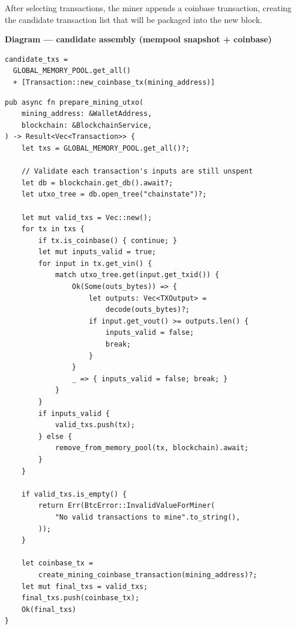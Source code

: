 After selecting transactions, the miner appends a coinbase transaction, creating the candidate transaction list that will be packaged into the new block.

\textbf{Diagram --- candidate assembly (mempool snapshot + coinbase)}

\begin{verbatim}
candidate_txs =
  GLOBAL_MEMORY_POOL.get_all()
  + [Transaction::new_coinbase_tx(mining_address)]
\end{verbatim}

\begin{listing}[htbp]
\caption{Candidate assembly ()}
\label{lst:9-6-2}
\begin{verbatim}
pub async fn prepare_mining_utxo(
    mining_address: &WalletAddress,
    blockchain: &BlockchainService,
) -> Result<Vec<Transaction>> {
    let txs = GLOBAL_MEMORY_POOL.get_all()?;

    // Validate each transaction's inputs are still unspent
    let db = blockchain.get_db().await?;
    let utxo_tree = db.open_tree("chainstate")?;

    let mut valid_txs = Vec::new();
    for tx in txs {
        if tx.is_coinbase() { continue; }
        let mut inputs_valid = true;
        for input in tx.get_vin() {
            match utxo_tree.get(input.get_txid()) {
                Ok(Some(outs_bytes)) => {
                    let outputs: Vec<TXOutput> =
                        decode(outs_bytes)?;
                    if input.get_vout() >= outputs.len() {
                        inputs_valid = false;
                        break;
                    }
                }
                _ => { inputs_valid = false; break; }
            }
        }
        if inputs_valid {
            valid_txs.push(tx);
        } else {
            remove_from_memory_pool(tx, blockchain).await;
        }
    }

    if valid_txs.is_empty() {
        return Err(BtcError::InvalidValueForMiner(
            "No valid transactions to mine".to_string(),
        ));
    }

    let coinbase_tx =
        create_mining_coinbase_transaction(mining_address)?;
    let mut final_txs = valid_txs;
    final_txs.push(coinbase_tx);
    Ok(final_txs)
}
\end{verbatim}
\end{listing}

